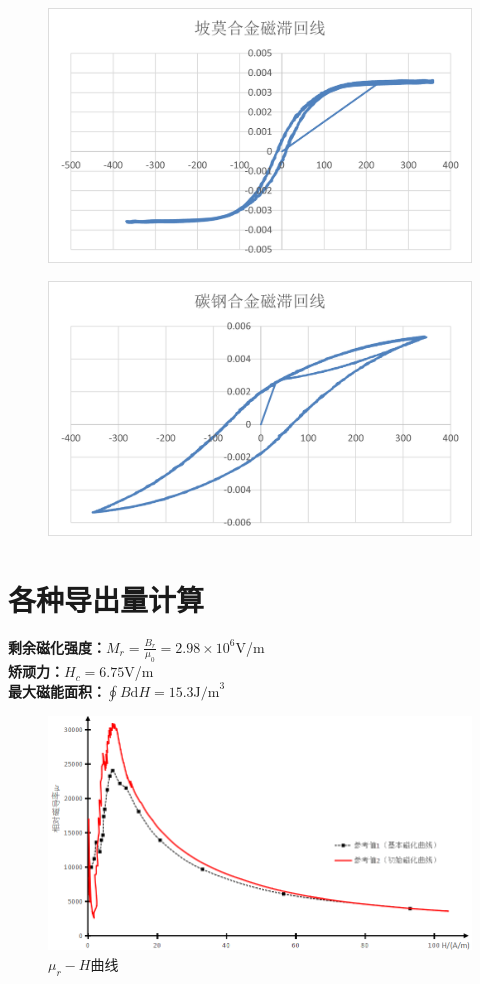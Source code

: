 \documentclass[dvipsnames, svgnames,a4paper,11pt]{article}
\renewcommand{\d}{\mathrm{d}}
\begin{document}
\begin{figure}[htbp]
	\includegraphics{磁滞回线/图片4.png}
\end{figure}
\begin{figure}[htbp]
	\includegraphics{磁滞回线/图片5.png}
\end{figure}
\section{各种导出量计算}
\textbf{剩余磁化强度：}$M_r=\frac{B_r}{\mu_0}=2.98\times10^6$V/m\\
\textbf{矫顽力：}$H_c=6.75$V/m\\
\textbf{最大磁能面积：}$\oint B\d H=15.3\text{J/m}^3$

\begin{figure}[htbp]
	\includegraphics{磁滞回线/图片6.png}
	\caption{$\mu_r-H$曲线}
\end{figure}
\newpage
\end{document}
